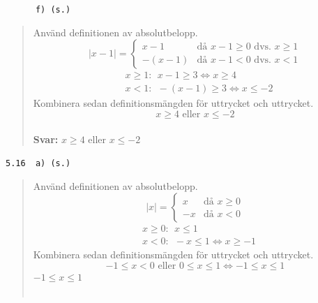 \documentclass[a4paper]{article}
\newcommand{\tskcol}[1]{\textcolor{tskcol}{#1}}
\begin{document}
	\pagebreak
	\texttt{\tskcol{~~~~~~f) (s.)}}
	\begin{quotation}
		\noindent
		Använd definitionen av absolutbelopp.
		\[|x-1|=
		\begin{cases}
		x-1&    \text{då } x-1 \ge 0 \text{ dvs. } x \ge 1\\
		-(x-1)& \text{då } x-1 < 0   \text{ dvs. } x < 1
		\end{cases}\]
		\begin{align*}
		& x \ge 1:~~ x-1 \ge 3 \Leftrightarrow x \ge 4\\
		& x < 1:~~ -(x-1) \ge 3 \Leftrightarrow x \le -2
		\end{align*}
		Kombinera sedan definitionsmängden för uttrycket och uttrycket.
		\[x \ge 4 \text{ eller } x \le -2\]
		\\
		\textbf{Svar:} $x \ge 4$ eller $x \le -2$
	\end{quotation}
	
	\texttt{\tskcol{5.16~~a) (s.)}}
	\begin{quotation}
		\noindent
		Använd definitionen av absolutbelopp.
		\[|x|=
		\begin{cases}
		x& \text{då } x \ge 0 \\
		-x& \text{då } x < 0
		\end{cases}\]
		\begin{align*}
		& x \ge 0:~~ x \le 1 \\
		& x < 0:~~ -x \le 1 \Leftrightarrow x \ge -1
		\end{align*}
		Kombinera sedan definitionsmängden för uttrycket och uttrycket.
		\[-1 \le x < 0 \text{ eller } 0 \le x \le 1 \Leftrightarrow -1 \le x \le 1\]
		$-1 \le x \le 1$ \\ \\
	\end{quotation}
	
\end{document}
